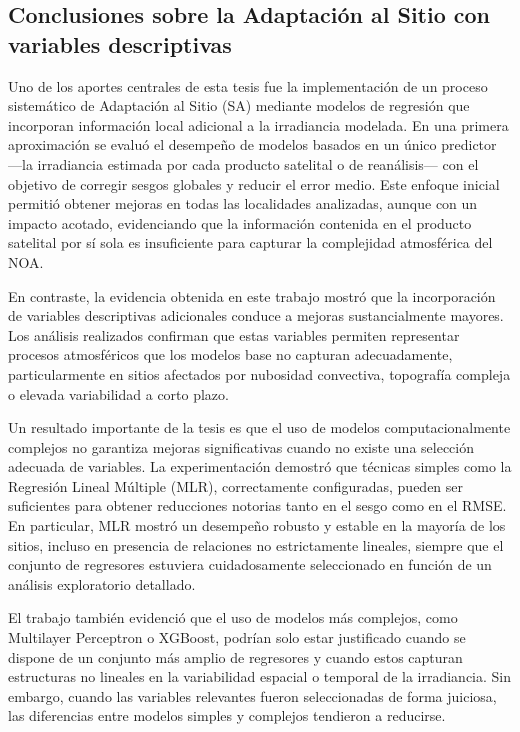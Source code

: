 \documentclass[letterpaper,12pt, twoside]{report}
\providecommand{\DIFdeltex}[1]{{\protect\color{red} \scriptsize #1}} %
\providecommand{\DIFdel}[1]{\texorpdfstring{\DIFdeltex{#1}}{}} %
\begin{document}
\subsection{\DIFdel{Conclusiones sobre la Adaptación al Sitio con variables descriptivas}}
\addtocounter{subsection}{-1}%
\DIFdel{Uno de los aportes centrales de esta tesis fue la implementación de un proceso sistemático de Adaptación al Sitio (SA) mediante modelos de regresión que incorporan información local adicional a la irradiancia modelada. En una primera aproximación se evaluó el desempeño de modelos basados en un único predictor —la irradiancia estimada por cada producto satelital o de reanálisis— con el objetivo de corregir sesgos globales y reducir el error medio. Este enfoque inicial permitió obtener mejoras en todas las localidades analizadas, aunque con un impacto acotado, evidenciando que la información contenida en el producto satelital por sí sola es insuficiente para capturar la complejidad atmosférica del NOA.
}%

\DIFdel{En contraste, la evidencia obtenida en este trabajo mostró que la incorporación de variables descriptivas adicionales conduce a mejoras sustancialmente mayores. Los análisis realizados confirman que estas variables permiten representar procesos atmosféricos que los modelos base no capturan adecuadamente, particularmente en sitios afectados por nubosidad convectiva, topografía compleja o elevada variabilidad a corto plazo.
}%

\DIFdel{Un resultado importante de la tesis es que el uso de modelos computacionalmente complejos no garantiza mejoras significativas cuando no existe una selección adecuada de variables. La experimentación demostró que técnicas simples como la Regresión Lineal Múltiple (MLR), correctamente configuradas, pueden ser suficientes para obtener reducciones notorias tanto en el sesgo como en el RMSE. En particular, MLR mostró un desempeño robusto y estable en la mayoría de los sitios, incluso en presencia de relaciones no estrictamente lineales, siempre que el conjunto de regresores estuviera cuidadosamente seleccionado en función de un análisis exploratorio detallado.
}%

\DIFdel{El trabajo también evidenció que el uso de modelos más complejos, como Multilayer Perceptron o XGBoost, podrían solo estar justificado cuando se dispone de un conjunto más amplio de regresores y cuando estos capturan estructuras no lineales en la variabilidad espacial o temporal de la irradiancia. Sin embargo, cuando las variables relevantes fueron seleccionadas de forma juiciosa, las diferencias entre modelos simples y complejos tendieron a reducirse.
}%
\end{document}
